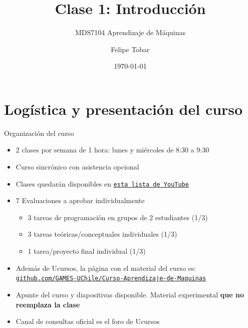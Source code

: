 \documentclass[9pt]{beamer}
\title{Clase 1: Introducción}
\subtitle{MDS7104 Aprendizaje de Máquinas}
\date{\today}
\author{Felipe Tobar}
\institute{Iniciativa de Datos e Inteligencia Artificial\\Universidad de Chile}
\begin{document}
\begin{frame}
  \titlepage
\end{frame}

\section{Logística y presentación del curso}
\begin{frame}{Organización del curso}

\begin{itemize}
  \item 2 clases por semana de 1 hora: lunes y miércoles de 8:30 a 9:30 
  \item Curso sincrónico con asistencia opcional
  \item Clases quedarán disponibles en \href{https://youtube.com/playlist?list=PLFX0Z9rxM84C0KhynBxdsROl8UERMUZBV}{\tt esta lista de YouTube}
  \item 7 Evaluaciones a aprobar individualmente 
  \begin{itemize}
    \item 3 tareas de programación en grupos de 2 estudiantes (1/3)
    \item 3 tareas teóricas/conceptuales individuales (1/3)
    \item 1 tarea/proyecto final individual (1/3)
  \end{itemize}
  \item Además de Ucursos, la página con el material del curso es: \href{https://github.com/GAMES-UChile/Curso-Aprendizaje-de-Maquinas}{\tt github.com/GAMES-UChile/Curso-Aprendizaje-de-Maquinas}
  \item Apunte del curso y diapositivas disponible. Material experimental \textbf{que no reemplaza la clase}
  \item Canal de consultas oficial es el foro de Ucursos
\end{itemize}

\end{frame}
\end{document}
